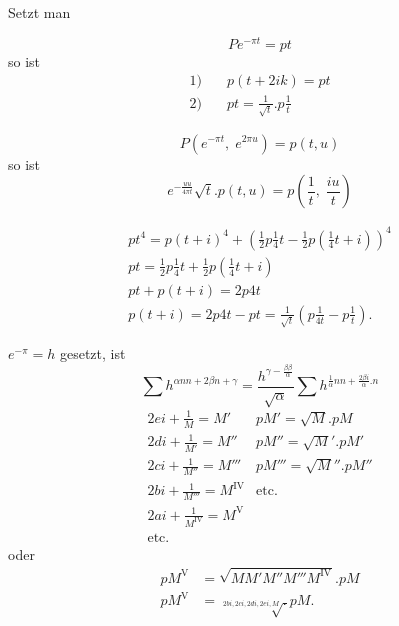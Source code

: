 \begingroup
\makeatletter\tagsleft@true\let\veqno\@@leqno\makeatother
\clearpage{}
\par\indent Setzt man\par
\noindent\begin{minipage}[t]{.44\linewidth}
\[Pe^{-\pi t}=pt\]
\noindent so ist
\[\begin{aligned}
1)\quad&p(t+2ik)=pt\\[.7em]
2)\quad&pt=\frac1{\surd t}.p\frac1t
\end{aligned}\]
\end{minipage}\hfill\begin{minipage}[t]{.53\linewidth}
\[P(e^{-\pi t},\;e^{2\pi u})=p(t,u)\]
\noindent so ist
\[e^{-\frac{uu}{4\pi t}}\sqrt t.p(t,u)=p\left(\frac1t,\;\frac{iu}t\right)\]
\end{minipage}
\[\begin{gathered}
pt^4=p(t+i)^4+\left(\tfrac12p\tfrac14t-\tfrac12p(\tfrac14t+i)\right)^4\\[.6em]
pt=\tfrac12p\tfrac14t+\tfrac12p(\tfrac14t+i)\\[.6em]
pt+p(t+i)=2p4t\\[.6em]
p(t+i)=2p4t-pt=\frac1{\surd t}\left(p\frac1{4t}-p\frac1t\right).
\end{gathered}\]
\ClosingRule
\par\indent \(e^{-\pi}=h\) gesetzt, ist
\[\sum h^{\alpha nn+2\beta n+\gamma}=\frac{h^{\gamma-\frac{\beta\beta}\alpha}}{\surd\alpha}\sum h^{\frac1\alpha nn+\frac{2\beta i}\alpha.n}\]
\ClosingRule
\[\begin{array}{ll}
2ei+\frac1M=M'&pM'=\surd M.pM\\[.7em]
2di+\frac1{M'}=M''&pM''=\surd M'.pM'\\[.7em]
2ci+\frac1{M''}=M'''&pM'''=\surd M''.pM''\\[.7em]
2bi+\frac1{M'''}=M^{\mathrm{IV}}&\text{etc.}\\[.7em]
2ai+\frac1{M^{\mathrm{IV}}}=M^{\mathrm V}&\\[.4em]
\text{etc.}&
\end{array}\]
\noindent oder
\[\begin{aligned}
pM^{\mathrm V}&=\sqrt{MM'M''M'''M^{\mathrm{IV}}}.pM\\
pM^{\mathrm V}&=\surd[2bi,2ci,2di,2ei,M].pM.
\end{aligned}\]
\ClosingRule
\clearpage{}
